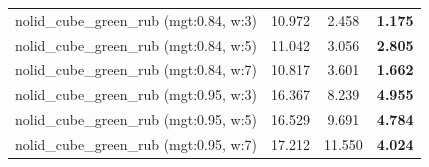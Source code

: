 \begin{table}[H]
{\begin{tabular}{l ccc}
        nolid\_cube\_green\_rub (mgt:0.84, w:3) & 10.972 & 2.458 & \textbf{1.175} \\
        nolid\_cube\_green\_rub (mgt:0.84, w:5) & 11.042 & 3.056 & \textbf{2.805} \\
        nolid\_cube\_green\_rub (mgt:0.84, w:7) & 10.817 & 3.601 & \textbf{1.662} \\
        nolid\_cube\_green\_rub (mgt:0.95, w:3) & 16.367 & 8.239 & \textbf{4.955} \\
        nolid\_cube\_green\_rub (mgt:0.95, w:5) & 16.529 & 9.691 & \textbf{4.784} \\
        nolid\_cube\_green\_rub (mgt:0.95, w:7) & 17.212 & 11.550 & \textbf{4.024} \\
        \bottomrule
    \end{tabular}
    }
\end{table}



\vspace{1cm}

\clearpage

